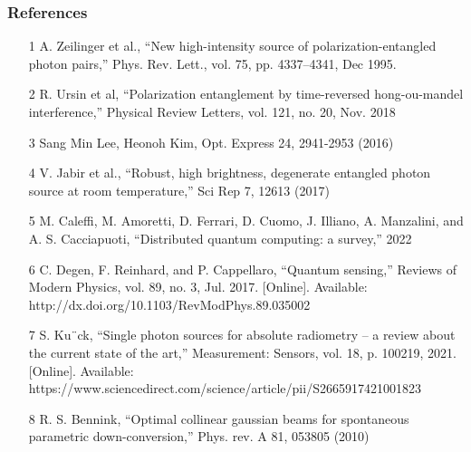 \documentclass[serif,8pt]{beamer}
\newcommand{\noPageNumber}{%
    \setbeamertemplate{footline}{}%
}
\begin{document}
\addtocounter{framenumber}{-1}
\begin{frame}[t]
\end{frame}
\usebackgroundtemplate{}

\addtocounter{framenumber}{-1}
\noPageNumber
\begin{frame}
	\frametitle{References}
	\tiny
	\begin{enumerate}
		\item[1] A. Zeilinger et al., “New high-intensity source of polarization-entangled photon pairs,” Phys. Rev. Lett., vol. 75, pp. 4337–4341, Dec 1995. 
		\item[2] R. Ursin et al, “Polarization entanglement by time-reversed hong-ou-mandel interference,” Physical Review Letters, vol. 121, no. 20, Nov. 2018
		\item[3] Sang Min Lee, Heonoh Kim, Opt. Express 24, 2941-2953 (2016)
		\item[4] V. Jabir et al., “Robust, high brightness, degenerate entangled photon source at room temperature,” Sci Rep 7, 12613 (2017)
		\item[5] M. Caleffi, M. Amoretti, D. Ferrari, D. Cuomo, J. Illiano, A. Manzalini, and A. S. Cacciapuoti, “Distributed quantum computing: a survey,” 2022
		\item[6] C. Degen, F. Reinhard, and P. Cappellaro, “Quantum sensing,” Reviews of Modern Physics, vol. 89, no. 3, Jul. 2017. [Online]. Available: http://dx.doi.org/10.1103/RevModPhys.89.035002 
		\item[7] S. Ku¨ck, “Single photon sources for absolute radiometry – a review about the current state of the art,” Measurement: Sensors, vol. 18, p. 100219, 2021. [Online]. Available: https://www.sciencedirect.com/science/article/pii/S2665917421001823 
		\item[8] R. S. Bennink, “Optimal collinear gaussian beams for spontaneous parametric down-conversion,” Phys. rev. A 81, 053805 (2010)
	\end{enumerate}
\end{frame}
\end{document}
